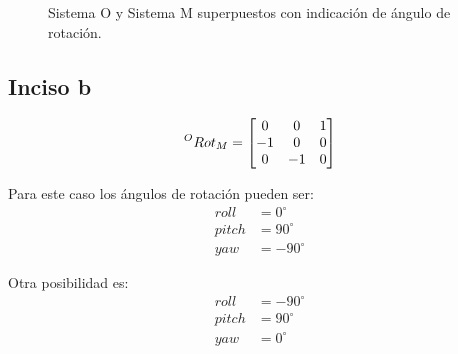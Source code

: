 \documentclass[a4paper,12pt]{article}
\begin{document}
\begin{figure}[H]
    \centering
    \begin{adjustbox}{scale = 0.85, max width=\columnwidth}
    \end{adjustbox}
    \caption{Sistema O y Sistema M superpuestos con indicación de ángulo de rotación.}
\end{figure}

\subsection{Inciso b}
\begin{equation*}
    \prescript{O}{}{Rot_M} = 
    \begin{bmatrix}
        0  &  0  & 1 \\
        -1 &  0  & 0 \\
        0  & -1  & 0
    \end{bmatrix}
\end{equation*}

Para este caso los ángulos de rotación pueden ser:
\begin{align*}
    roll  &=   0^\circ\\
    pitch &=  90^\circ\\
    yaw   &= -90^\circ
\end{align*}

Otra posibilidad es:
\begin{align*}
    roll  &= -90^\circ\\
    pitch &=  90^\circ\\
    yaw   &=   0^\circ
\end{align*}
    
\end{document}

